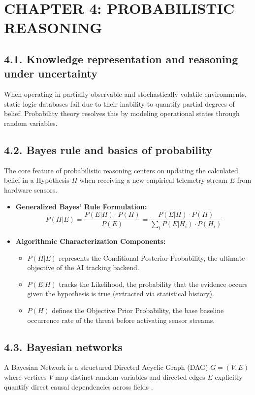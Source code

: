 \documentclass[../main.tex]{subfiles}
\begin{document}

\section{CHAPTER 4: PROBABILISTIC REASONING}

\subsection{4.1. Knowledge representation and reasoning under uncertainty}
When operating in partially observable and stochastically volatile environments, static logic databases fail due to their inability to quantify partial degrees of belief. Probability theory resolves this by modeling operational states through random variables.

\subsection{4.2. Bayes rule and basics of probability}
The core feature of probabilistic reasoning centers on updating the calculated belief in a Hypothesis $H$ when receiving a new empirical telemetry stream $E$ from hardware sensors.
\begin{itemize}
    \item \textbf{Generalized Bayes' Rule Formulation:}
    \begin{equation}
        P(H | E) = \frac{P(E | H) \cdot P(H)}{P(E)} = \frac{P(E | H) \cdot P(H)}{\sum_{i} P(E | H_i) \cdot P(H_i)}
    \end{equation}
    \item \textbf{Algorithmic Characterization Components:}
    \begin{itemize}
        \item $P(H | E)$ represents the Conditional Posterior Probability, the ultimate objective of the AI tracking backend.
        \item $P(E | H)$ tracks the Likelihood, the probability that the evidence occurs given the hypothesis is true (extracted via statistical history).
        \item $P(H)$ defines the Objective Prior Probability, the base baseline occurrence rate of the threat before activating sensor streams.
    \end{itemize}
\end{itemize}

\subsection{4.3. Bayesian networks}
A Bayesian Network is a structured Directed Acyclic Graph (DAG) $G=(V,E)$ where vertices $V$ map distinct random variables and directed edges $E$ explicitly quantify direct causal dependencies across fields \cite{mutzari2025defending}.
\end{document}
